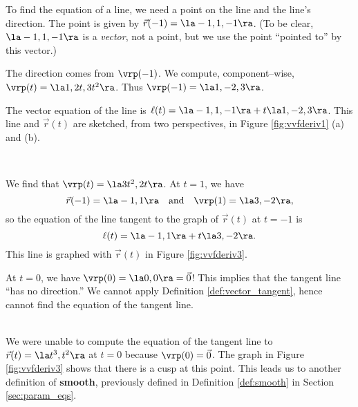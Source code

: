 {To find the equation of a line, we need a point on the line and the line's direction. The point is given by $\vec r(-1) = \la -1,1,-1\ra$. (To be clear, $\la -1,1,-1\ra$ is a \emph{vector}, not a point, but we use the point ``pointed to'' by this vector.)

The direction comes from $\vrp(-1)$. We compute, component--wise, $\vrp(t) = \la 1,2t, 3t^2\ra$. Thus $\vrp(-1) = \la 1,-2,3\ra$. 

The vector equation of the line is $\ell(t) = \la -1,1,-1\ra + t\la 1,-2,3\ra$. This line and $\vec r(t)$ are sketched, from two perspectives, in Figure \ref{fig:vvfderiv1} (a) and (b).
}\\

{We find that $\vrp(t) = \la 3t^2,2t\ra$. At $t=1$, we have
$$\vec r(-1) = \la -1,1\ra\quad \text{and}\quad \vrp(1) = \la 3,-2\ra,$$
so the equation of the line tangent to the graph of $\vec r(t)$ at $t=-1$ is
$$\ell(t) = \la -1,1\ra + t\la 3,-2\ra.$$ This line is graphed with $\vec r(t)$ in Figure \ref{fig:vvfderiv3}.

At $t=0$, we have $\vrp(0) = \la 0,0\ra=\vec 0$! This implies that the tangent line ``has no direction.'' We cannot apply Definition \ref{def:vector_tangent}, hence cannot find the equation of the tangent line.
}\\

We were unable to compute the equation of the tangent line to $\vec r(t)= \la t^3,t^2\ra$ at $t=0$ because $\vrp(0) = \vec 0$. The graph in Figure \ref{fig:vvfderiv3} shows that there is a cusp at this point. This leads us to another definition of \textbf{smooth}, previously defined in Definition \ref{def:smooth} in Section \ref{sec:param_eqs}.

